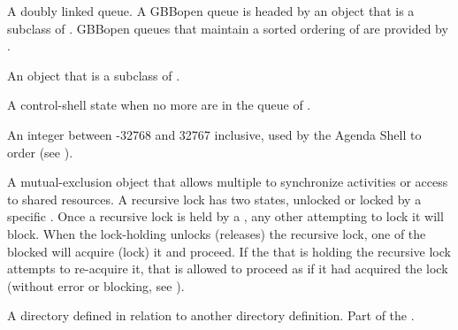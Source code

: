 \begin{glossary-list}

\glent[queue]
%
%
A doubly linked queue.  A GBBopen queue is headed by an object that is a
subclass of \textbf{}.  GBBopen queues that maintain a
sorted ordering of  are provided by
.


%
%
%
An object that is a subclass of .


\glent[quiescence]
%
%
A control-shell state when no more  are in the queue of
.


\glent[rating]
%
An integer between -32768 and 32767 inclusive, used by the Agenda Shell to
order  (see \textbf{}).


%
%
%
%
%
A mutual-exclusion object that allows multiple  to synchronize
activities or access to shared resources. A recursive lock has two states,
unlocked or locked by a specific . Once a recursive lock is held
by a , any other  attempting to lock it will
block. When the lock-holding  unlocks (releases) the recursive
lock, one of the blocked  will acquire (lock) it and proceed.
If the  that is holding the recursive lock attempts to
re-acquire it, that  is allowed to proceed as if it had acquired
the lock (without error or blocking, see ).


%
%
%
%
%
A directory defined in relation to another directory definition.
Part of the .


\end{glossary-list}
